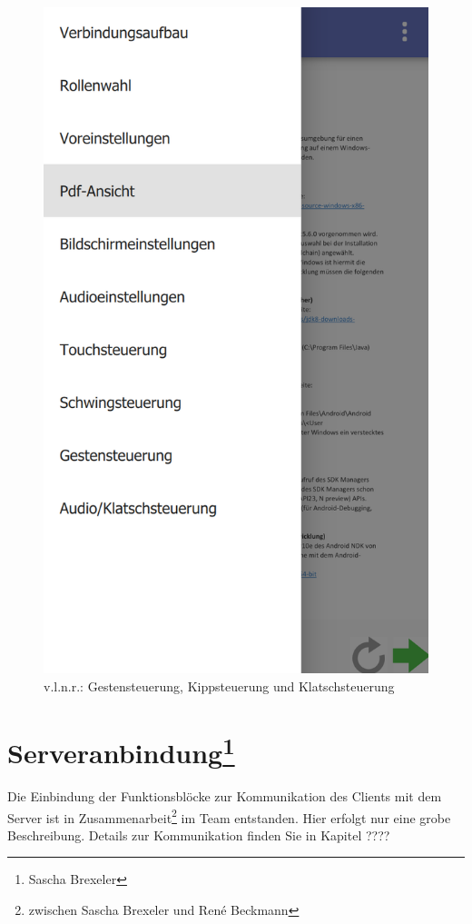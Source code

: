 \begin{figure}[ht!]
\begin{minipage}{0.31\linewidth}
		\includegraphics[scale=0.5]{GUI/Bilder/6-Menu-Button-Drawer-mit-Listview.PNG}
	\end{minipage}
	\caption{v.l.n.r.: Gestensteuerung, Kippsteuerung und Klatschsteuerung{\tiny}}
	\label{client:InformationenBedienhilfen}
\end{figure}


\section[Serveranbindung]{Serveranbindung\footnote{Sascha Brexeler}}
\label{client-Serveranbindung}
Die Einbindung der Funktionsblöcke zur Kommunikation des Clients mit dem Server ist in Zusammenarbeit\footnote{zwischen Sascha Brexeler und René Beckmann} im Team entstanden. Hier erfolgt nur eine grobe Beschreibung. Details zur Kommunikation finden Sie in Kapitel ????


